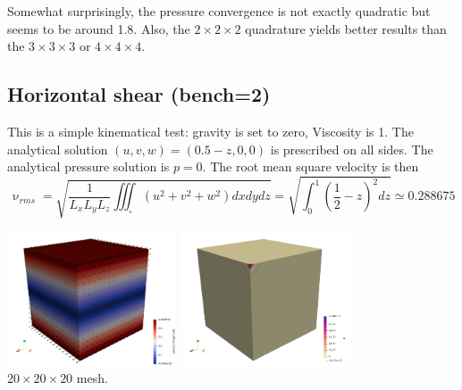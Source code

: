Somewhat surprisingly, the pressure convergence is not exactly quadratic but seems to be
around 1.8. Also, the $2\times 2\times 2$ 
quadrature yields better results than the $3\times 3\times 3$ or $4\times 4 \times 4$.

\newpage
\subsection*{Horizontal shear (bench=2)}

This is a simple kinematical test: gravity is set to zero, 
Viscosity is 1.
The analytical solution $(u,v,w)=(0.5-z,0,0)$ is prescribed on all sides. 
The analytical pressure solution is $p=0$.
The root mean square velocity is then
\[
\upnu_{rms}
=\sqrt{ \frac{1}{L_xL_yL_z} \iiint_\square (u^2+v^2+w^2)dxdydz }
=\sqrt{ \int_0^1 (\frac12-z)^2dz  }
\simeq 0.288675
\]

\begin{center}
\includegraphics[width=5cm]{python_codes/fieldstone_82/RESULTS/bench2/vel}
\includegraphics[width=5cm]{python_codes/fieldstone_82/RESULTS/bench2/press}\\
{\captionfont $20\times 20 \times 20$ mesh.} 
\end{center}


